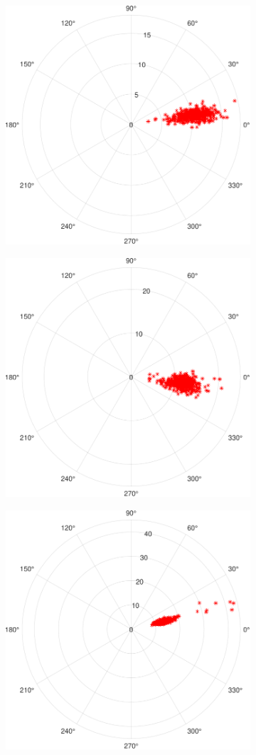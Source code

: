 \documentclass[binding=0.6cm,noexaminfo]{sapthesis}
\begin{document}
\begin{figure}[h!]
\centering
\begin{subfigure}{.49\textwidth}
	\centering
	\includegraphics[width=.7\linewidth]{ce-v2-3-sanitized_phase subcarrier_1}
	\caption{}
\end{subfigure}
\begin{subfigure}{.49\textwidth}
	\centering
	\includegraphics[width=.7\linewidth]{ce-v2-3-sanitized_phase subcarrier_21}
	\caption{}
\end{subfigure}
\begin{subfigure}{.49\textwidth}
	\centering
	\includegraphics[width=.7\linewidth]{room2-v7-6-sanitized_phase subcarrier_1}

\end{subfigure}
\end{figure}
\end{document}
